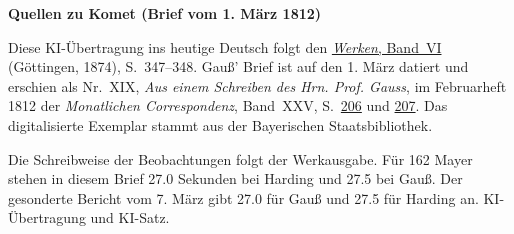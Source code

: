 \clearpage\thispagestyle{empty}
\begin{center}\textbf{Quellen zu Komet (Brief vom 1. März 1812)}\end{center}
\noindent Diese KI-Übertragung ins heutige Deutsch folgt den \href{https://gdz.sub.uni-goettingen.de/id/PPN236007467}{\textit{Werken}, Band~VI} (Göttingen, 1874), S.~347--348. Gauß’ Brief ist auf den 1. März datiert und erschien als Nr.~XIX, \textit{Aus einem Schreiben des Hrn. Prof. Gauss}, im Februarheft 1812 der \textit{Monatlichen Correspondenz}, Band~XXV, S.~\href{https://api.digitale-sammlungen.de/iiif/image/v2/bsb10538614_00214/full/1600,/0/default.jpg}{206} und \href{https://api.digitale-sammlungen.de/iiif/image/v2/bsb10538614_00215/full/1600,/0/default.jpg}{207}. Das digitalisierte Exemplar stammt aus der Bayerischen Staatsbibliothek.
\par\smallskip\noindent Die Schreibweise der Beobachtungen folgt der Werkausgabe. Für 162 Mayer stehen in diesem Brief 27.0 Sekunden bei Harding und 27.5 bei Gauß. Der gesonderte Bericht vom 7. März gibt 27.0 für Gauß und 27.5 für Harding an. KI-Übertragung und KI-Satz.
\clearpage
